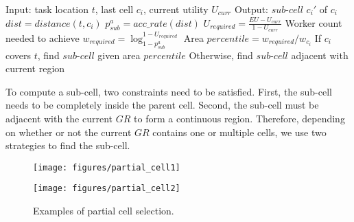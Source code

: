 \documentclass{USC-Thesis}
\renewcommand{\sc}{\textsc}
\numberwithin{equation}{chapter}
\begin{document}
\begin{algorithm} [ht]
\caption{\sc Partial Cell Selection Heuristic}
\small
\begin{algorithmic}[1]
\STATE Input: task location $t$, last cell $c_i$, current utility $U_{curr}$\label{line:input_partial_cell}
\STATE Output: $sub$-$cell$ $c_i'$ of $c_i$
\STATE $dist=distance(t,c_i)$ \label{line:compute_distance}
\STATE $p^a_{sub}=acc\_rate(dist)$
\STATE $U_{required} = \frac{EU-U_{curr}}{1-U_{curr}} $ \label{line:u_need}
\STATE Worker count needed to achieve $w_{required}=\log_{1-p^a_{sub}}^{1-U_{required}}$ \label{line:w_need}
\STATE Area $percentile = w_{required}/w_{c_i}$ \label{line:compute_percentile}
\STATE If $c_i$ covers $t$, find $sub$-$cell$ given area $percentile$ \label{line:one_cell}
\STATE Otherwise, find $sub$-$cell$ adjacent with current region \label{line:multiple_cell}
\end{algorithmic}
\label{alg:partial_cell}
\end{algorithm}

To compute a sub-cell, two constraints need to be satisfied. First, the sub-cell needs to be completely inside the parent cell. Second, the sub-cell must be adjacent with the current $\mathit{GR}$ to form a continuous region. Therefore, depending on whether or not the current $\mathit{GR}$ contains one or multiple cells, we use two strategies to find the sub-cell. 

\begin{figure}[tbh]
	\begin{minipage}[b]{.45\linewidth}
	\centering
		\texttt{[image: figures/partial\_cell1]}
		\label{fig:partial_cell1}
	\end{minipage}
	\hspace{8pt}
	\begin{minipage}[b]{.45\linewidth}
	\centering
		\texttt{[image: figures/partial\_cell2]}
		\label{fig:partial_cell2}
	\end{minipage}
	\caption{Examples of partial cell selection.}
\label{fig:examples}
\end{figure}
\end{document}
